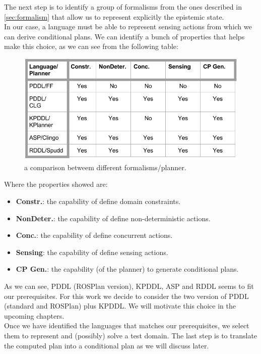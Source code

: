 \documentclass[pdftex,12pt,a4paper]{report}
\begin{document}
\noindent The next step is to identify a group of formalisms from the ones described in \ref{sec:formalism} that allow us to represent explicitly the epistemic state.\\
In our case, a language must be able to represent sensing actions from which we can derive conditional plans.
We can identify a bunch of properties that helps make this choice, as we can see from the following table:
\begin{figure}[H]
	\centering
	\includegraphics[scale=0.5,trim=30mm 0mm 0mm 0mm]{images/formalisms.png}
	\caption{a comparison betweem different formalisms/planner.}
	\label{fig:formalisms}
\end{figure}
\newpage
Where the properties showed are:
\begin{itemize}
\item \textbf{Constr.}: the capability of define domain constraints.
\item \textbf{NonDeter.}: the capability of define non-deterministic actions.
\item \textbf{Conc.}: the capability of define concurrent actions.
\item \textbf{Sensing}: the capability of define sensing actions.
\item \textbf{CP Gen.}: the capability (of the planner) to generate conditional plans.
\end{itemize}
\noindent As we can see, PDDL (ROSPlan version), KPDDL, ASP and RDDL seems to fit our prerequisites. For this work we decide to consider the two version of PDDL (standard and ROSPlan) plus KPDDL. We will motivate this choice in the upcoming chapters.\\
\noindent Once we have identified the languages that matches our prerequisites, we select them to represent and (possibly) solve a test domain. The last step is to translate the computed plan into a conditional plan as we will discuss later.\\
\end{document}
